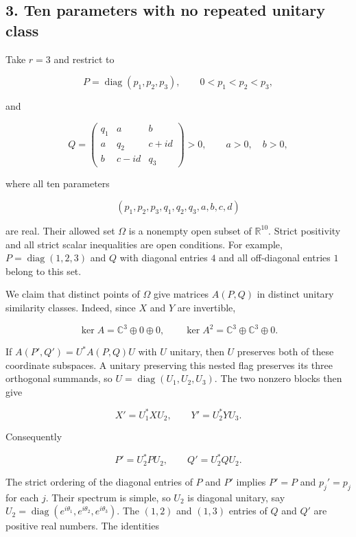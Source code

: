 \documentclass[10pt,a4paper]{article}
\begin{document}
\subsection{3. Ten parameters with no repeated unitary
class}\label{ten-parameters-with-no-repeated-unitary-class}

Take \(r=3\) and restrict to

\nopagebreak[4]
\[
P=\operatorname{diag}(p_1,p_2,p_3),\qquad 0<p_1<p_2<p_3,
\]

and

\nopagebreak[4]
\[
Q=\begin{pmatrix}
q_1&a&b\\
a&q_2&c+id\\
b&c-id&q_3
\end{pmatrix}>0,\qquad a>0,\quad b>0,
\]

where all ten parameters

\nopagebreak[4]
\[
(p_1,p_2,p_3,q_1,q_2,q_3,a,b,c,d)
\]

are real. Their allowed set \(\Omega\) is a nonempty open subset of
\(\mathbb R^{10}\). Strict positivity and all strict scalar inequalities
are open conditions. For example, \(P=\operatorname{diag}(1,2,3)\) and
\(Q\) with diagonal entries \(4\) and all off-diagonal entries \(1\)
belong to this set.

We claim that distinct points of \(\Omega\) give matrices \(A(P,Q)\) in
distinct unitary similarity classes. Indeed, since \(X\) and \(Y\) are
invertible,

\nopagebreak[4]
\[
\ker A=\mathbb C^3\oplus0\oplus0,
\qquad
\ker A^2=\mathbb C^3\oplus\mathbb C^3\oplus0.
\]

If \(A(P',Q')=U^*A(P,Q)U\) with \(U\) unitary, then \(U\) preserves both
of these coordinate subspaces. A unitary preserving this nested flag
preserves its three orthogonal summands, so
\(U=\operatorname{diag}(U_1,U_2,U_3)\). The two nonzero blocks then give

\nopagebreak[4]
\[
X'=U_1^*XU_2,\qquad Y'=U_2^*YU_3.
\]

Consequently

\nopagebreak[4]
\[
P'=U_2^*PU_2,\qquad Q'=U_2^*QU_2.
\]

The strict ordering of the diagonal entries of \(P\) and \(P'\) implies
\(P'=P\) and \(p_j'=p_j\) for each \(j\). Their spectrum is simple, so
\(U_2\) is diagonal unitary, say
\(U_2=\operatorname{diag}(e^{i\theta_1},e^{i\theta_2},e^{i\theta_3})\).
The \((1,2)\) and \((1,3)\) entries of \(Q\) and \(Q'\) are positive
real numbers. The identities
\end{document}
